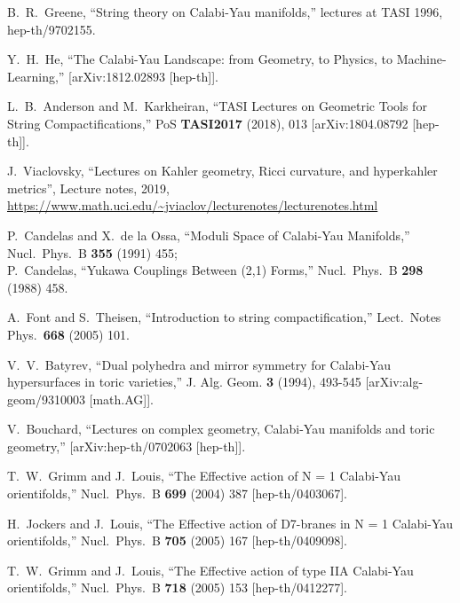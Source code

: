 \documentclass[12pt]{article}
\numberwithin{equation}{section}
\begin{document}
\begin{thebibliography}{999}
  B.~R.~Greene, ``String theory on Calabi-Yau manifolds,'' lectures at TASI 1996, hep-th/9702155.
  
Y.~H.~He,
``The Calabi-Yau Landscape: from Geometry, to Physics, to Machine-Learning,'' [arXiv:1812.02893 [hep-th]].

L.~B.~Anderson and M.~Karkheiran,
``TASI Lectures on Geometric Tools for String Compactifications,''
PoS \textbf{TASI2017} (2018), 013
[arXiv:1804.08792 [hep-th]].

J.~Viaclovsky, ``Lectures on Kahler geometry, Ricci curvature, and hyperkahler metrics'', Lecture notes, 2019,\\ \url{https://www.math.uci.edu/~jviaclov/lecturenotes/lecturenotes.html}

  P.~Candelas and X.~de la Ossa,
  ``Moduli Space of {Calabi-Yau} Manifolds,''
  Nucl.\ Phys.\ B {\bf 355} (1991) 455;\\
  P.~Candelas,
  ``Yukawa Couplings Between (2,1) Forms,''
  Nucl.\ Phys.\ B {\bf 298} (1988) 458.

  A.~Font and S.~Theisen,
  ``Introduction to string compactification,''
  Lect.\ Notes Phys.\  {\bf 668} (2005) 101.

V.~V.~Batyrev,
``Dual polyhedra and mirror symmetry for Calabi-Yau hypersurfaces in toric varieties,''
J. Alg. Geom. \textbf{3} (1994), 493-545
[arXiv:alg-geom/9310003 [math.AG]].

V.~Bouchard,
``Lectures on complex geometry, Calabi-Yau manifolds and toric geometry,''
[arXiv:hep-th/0702063 [hep-th]].

  T.~W.~Grimm and J.~Louis,
  ``The Effective action of N = 1 Calabi-Yau orientifolds,''
  Nucl.\ Phys.\ B {\bf 699} (2004) 387 [hep-th/0403067].

  H.~Jockers and J.~Louis,
  ``The Effective action of D7-branes in N = 1 Calabi-Yau orientifolds,''
  Nucl.\ Phys.\ B {\bf 705} (2005) 167 [hep-th/0409098].

  T.~W.~Grimm and J.~Louis,
  ``The Effective action of type IIA Calabi-Yau orientifolds,''
  Nucl.\ Phys.\ B {\bf 718} (2005) 153 [hep-th/0412277].


\end{thebibliography}
\end{document}
